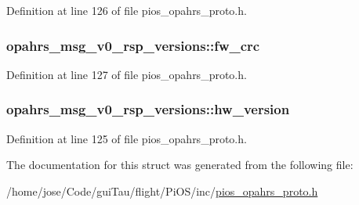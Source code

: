 Definition at line 126 of file pios\-\_\-opahrs\-\_\-proto.\-h.

\hypertarget{structopahrs__msg__v0__rsp__versions_ad2fa4e6c6243362e5f549d00832d5842}{
\subsubsection[{fw\-\_\-crc}]{ opahrs\-\_\-msg\-\_\-v0\-\_\-rsp\-\_\-versions\-::fw\-\_\-crc}}\label{structopahrs__msg__v0__rsp__versions_ad2fa4e6c6243362e5f549d00832d5842}


Definition at line 127 of file pios\-\_\-opahrs\-\_\-proto.\-h.

\hypertarget{structopahrs__msg__v0__rsp__versions_a5ae484673fec2445758ec852a3d04661}{
\subsubsection[{hw\-\_\-version}]{ opahrs\-\_\-msg\-\_\-v0\-\_\-rsp\-\_\-versions\-::hw\-\_\-version}}\label{structopahrs__msg__v0__rsp__versions_a5ae484673fec2445758ec852a3d04661}


Definition at line 125 of file pios\-\_\-opahrs\-\_\-proto.\-h.



The documentation for this struct was generated from the following file\-:\begin{DoxyCompactItemize}
\item 
/home/jose/\-Code/gui\-Tau/flight/\-Pi\-O\-S/inc/\hyperlink{pios__opahrs__proto_8h}{pios\-\_\-opahrs\-\_\-proto.\-h}\end{DoxyCompactItemize}

